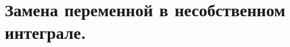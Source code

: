 \documentclass[../main.tex]{subfiles}
\begin{document}
\newpage
\section{Замена переменной в несобственном интеграле.}
\end{document}
